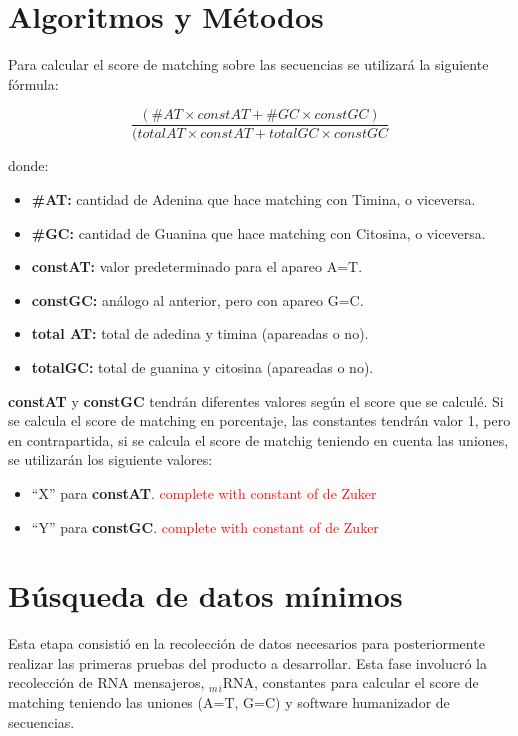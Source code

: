 \documentclass[12pt,a4paper,spanish]{article}
\begin{document}
\section{Algoritmos y Métodos}
	\par Para calcular el score de matching sobre las secuencias se utilizará la siguiente fórmula:

		\begin{equation}	
			\frac{(\#AT \times constAT + \#GC \times constGC)}{(totalAT \times constAT + totalGC \times constGC}
		\end{equation}	

		\par donde:
		\begin{itemize}
			\item \textbf{\#AT:} cantidad de Adenina que hace matching con Timina, o viceversa.
			\item \textbf{\#GC:} cantidad de Guanina que hace matching con Citosina, o viceversa.
			\item \textbf{constAT:} valor predeterminado para el apareo A=T.
			\item \textbf{constGC:} análogo al anterior, pero con apareo G=C.
			\item \textbf{total AT:} total de adedina y timina (apareadas o no).
			\item \textbf{totalGC:} total de guanina y citosina (apareadas o no).	
		\end{itemize}

	\par \textbf{constAT} y \textbf{constGC} tendrán diferentes valores según el score que se calculé. Si se calcula el 	score de matching en porcentaje, las constantes tendrán valor 1, pero en contrapartida, si se calcula el score de 		matchig teniendo en cuenta las uniones, se utilizarán los siguiente valores:
	\begin{itemize}
		\item ``X'' para \textbf{constAT}. \textcolor{red}{complete with constant of de Zuker}
		\item ``Y'' para \textbf{constGC}. \textcolor{red}{complete with constant of de Zuker}
	\end{itemize}

\section{Búsqueda de datos mínimos}
	\par Esta etapa consistió en la recolección de datos necesarios para posteriormente realizar las primeras pruebas del 		producto a desarrollar. Esta fase involucró la recolección de RNA mensajeros, $_m$$_i$RNA, constantes para calcular el 		score de matching teniendo las uniones (A=T, G=C) y software humanizador de secuencias.
\end{document}
